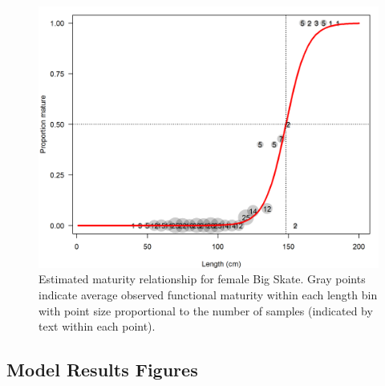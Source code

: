 \documentclass[12pt,]{article}
\begin{document}
\begin{figure}
\centering
\includegraphics{Figures/BigSkate_maturity.png}
\caption{Estimated maturity relationship for female Big Skate. Gray
points indicate average observed functional maturity within each length
bin with point size proportional to the number of samples (indicated by
text within each point).\label{fig:maturity}}
\end{figure}

\FloatBarrier
\newpage

\FloatBarrier
\newpage

\hypertarget{model-results-figures}{%
\subsection{Model Results Figures}\label{model-results-figures}}

\FloatBarrier
\end{document}
